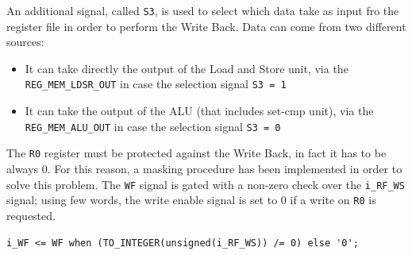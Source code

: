 An additional signal, called \texttt{S3}, is used to select which data take as input fro the register file in order to perform the Write Back. Data can come from two different sources:
\begin{itemize}
	\itemsep0sp
	\item It can take directly the output of the Load and Store unit, via the \texttt{REG\_MEM\_LDSR\_OUT} in case the selection signal \texttt{S3 = 1}
	\item It can take the output of the ALU (that includes set-cmp unit), via the \texttt{REG\_MEM\_ALU\_OUT} in case the selection signal \texttt{S3 = 0}
\end{itemize}

The \texttt{R0} register must be protected against the Write Back, in fact it has to be always 0. For this reason, a masking procedure has been implemented in order to solve this problem. The \texttt{WF} signal is gated with a non-zero check over the \texttt{i\_RF\_WS} signal; using few words, the write enable signal is set to 0 if a write on \texttt{R0} is requested.

\hfill
\begin{lstlisting}[style=vhdl,caption={VHDL code gating for the WS signal coming from the CU}]
	i_WF <= WF when (TO_INTEGER(unsigned(i_RF_WS)) /= 0) else '0';
\end{lstlisting}